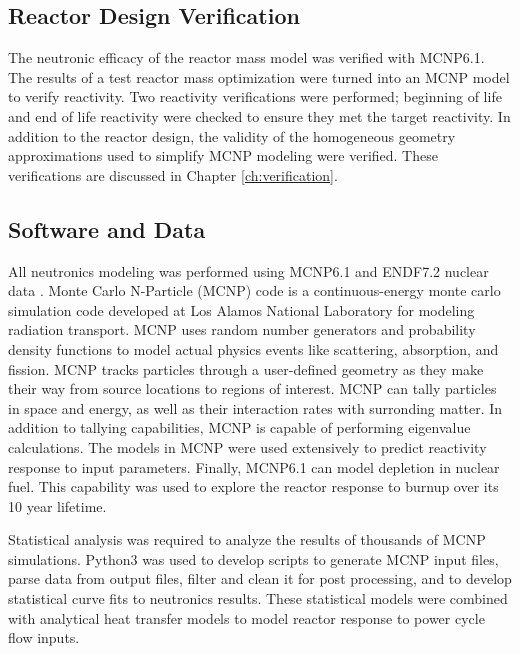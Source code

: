 \subsection{Reactor Design Verification}
The neutronic efficacy of the reactor mass model was verified with MCNP6.1. The
results of a test reactor mass optimization were turned into an MCNP model to
verify reactivity. Two reactivity verifications were performed; beginning of life
and end of life reactivity were checked to ensure they met the target
reactivity. In addition to the reactor design, the validity of the homogeneous
geometry approximations used to simplify MCNP modeling were verified. These
verifications are discussed in Chapter \ref{ch:verification}.

\subsection{Software and Data}
All neutronics modeling was performed using MCNP6.1 and ENDF7.2 nuclear data 
\cite{mcnp_citation}. Monte Carlo N-Particle (MCNP) code is a continuous-energy 
monte carlo simulation code developed at Los Alamos National Laboratory
for modeling radiation transport. MCNP uses random number generators and
probability density functions to model actual physics events like scattering,
absorption, and fission. MCNP tracks particles through a user-defined geometry
as they make their way from source locations to regions of interest. MCNP can
tally particles in space and energy, as well as their interaction rates with
surronding matter. In addition to tallying capabilities, MCNP is capable of
performing eigenvalue calculations. The \keff models in MCNP were used
extensively to predict reactivity response to input parameters. Finally, MCNP6.1
can model depletion in nuclear fuel. This capability was used to explore the
reactor response to burnup over its 10 year lifetime.

Statistical analysis was required to analyze the results of thousands of MCNP
simulations. Python3 was used to develop scripts to generate MCNP input files, parse data from output
files, filter and clean it for post processing, and to develop statistical curve
fits to neutronics results. These statistical models were combined with
analytical heat transfer models to model reactor response to power cycle flow
inputs.
